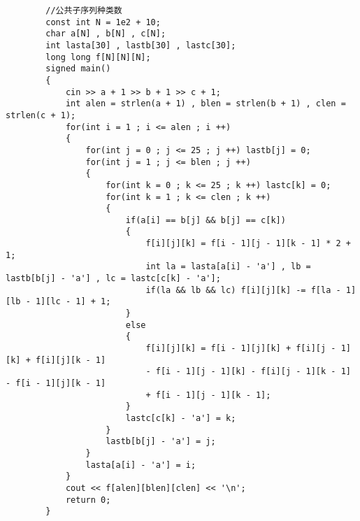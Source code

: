 \documentclass[E:/GsjzTle/main/main.tex]{subfiles}
\begin{document}
	\begin{lstlisting}
		//公共子序列种类数
		const int N = 1e2 + 10;
		char a[N] , b[N] , c[N];
		int lasta[30] , lastb[30] , lastc[30];
		long long f[N][N][N]; 
		signed main()
		{
			cin >> a + 1 >> b + 1 >> c + 1;
			int alen = strlen(a + 1) , blen = strlen(b + 1) , clen = strlen(c + 1);
			for(int i = 1 ; i <= alen ; i ++)
			{
				for(int j = 0 ; j <= 25 ; j ++) lastb[j] = 0;
				for(int j = 1 ; j <= blen ; j ++)
				{
					for(int k = 0 ; k <= 25 ; k ++) lastc[k] = 0;
					for(int k = 1 ; k <= clen ; k ++)
					{
						if(a[i] == b[j] && b[j] == c[k])
						{
							f[i][j][k] = f[i - 1][j - 1][k - 1] * 2 + 1;
							int la = lasta[a[i] - 'a'] , lb = lastb[b[j] - 'a'] , lc = lastc[c[k] - 'a'];
							if(la && lb && lc) f[i][j][k] -= f[la - 1][lb - 1][lc - 1] + 1;
						}
						else
						{
							f[i][j][k] = f[i - 1][j][k] + f[i][j - 1][k] + f[i][j][k - 1]
							- f[i - 1][j - 1][k] - f[i][j - 1][k - 1] - f[i - 1][j][k - 1]
							+ f[i - 1][j - 1][k - 1];
						}
						lastc[c[k] - 'a'] = k;
					}
					lastb[b[j] - 'a'] = j;
				}
				lasta[a[i] - 'a'] = i;
			}
			cout << f[alen][blen][clen] << '\n';
			return 0;
		}
	\end{lstlisting}
	
\end{document}
